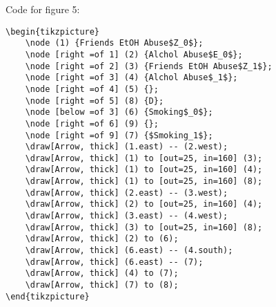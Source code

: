 \documentclass{article}
\begin{document}
Code for figure 5:
\begin{lstlisting}[frame=single]
    \begin{tikzpicture}
    \node (1) {Friends EtOH Abuse$Z_0$};
    \node [right =of 1] (2) {Alchol Abuse$E_0$};
    \node [right =of 2] (3) {Friends EtOH Abuse$Z_1$};
    \node [right =of 3] (4) {Alchol Abuse$_1$};
    \node [right =of 4] (5) {};
    \node [right =of 5] (8) {D};
    \node [below =of 3] (6) {Smoking$_0$};
    \node [right =of 6] (9) {};
    \node [right =of 9] (7) {$Smoking_1$};
    \draw[Arrow, thick] (1.east) -- (2.west);
    \draw[Arrow, thick] (1) to [out=25, in=160] (3);
    \draw[Arrow, thick] (1) to [out=25, in=160] (4);
    \draw[Arrow, thick] (1) to [out=25, in=160] (8);
    \draw[Arrow, thick] (2.east) -- (3.west);
    \draw[Arrow, thick] (2) to [out=25, in=160] (4);
    \draw[Arrow, thick] (3.east) -- (4.west);
    \draw[Arrow, thick] (3) to [out=25, in=160] (8);
    \draw[Arrow, thick] (2) to (6);
    \draw[Arrow, thick] (6.east) -- (4.south);
    \draw[Arrow, thick] (6.east) -- (7);
    \draw[Arrow, thick] (4) to (7);
    \draw[Arrow, thick] (7) to (8);
\end{tikzpicture}

\end{lstlisting}
\end{document}
